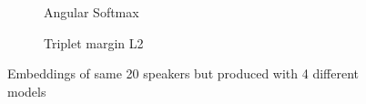 \begin{figure}[h]
\begin{center}
\begin{subfigure}[t]{7.5cm}
		\caption{Angular Softmax}
	\end{subfigure}
	\begin{subfigure}[t]{7.5cm}
		\caption{Triplet margin L2}
	\end{subfigure}
\end{center}
\caption{Embeddings of same 20 speakers but produced with 4 different models}
\label{fig:tsne}
\end{figure}
